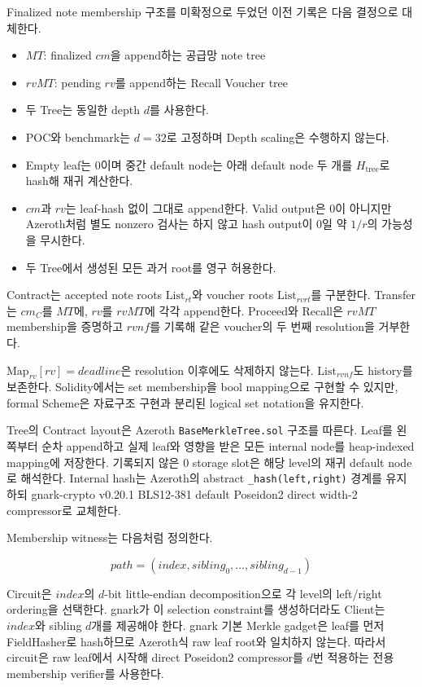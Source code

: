 \documentclass[11pt]{extarticle}
\newcommand{\List}[1]{\mathrm{List}_{#1}}
\newcommand{\Map}[1]{\mathrm{Map}_{#1}}
\begin{document}
Finalized note membership 구조를 미확정으로 두었던 이전 기록은 다음 결정으로 대체한다.

\begin{itemize}
  \item $MT$: finalized $cm$을 append하는 공급망 note tree
  \item $rvMT$: pending $rv$를 append하는 Recall Voucher tree
  \item 두 Tree는 동일한 depth $d$를 사용한다.
  \item POC와 benchmark는 $d=32$로 고정하며 Depth scaling은 수행하지 않는다.
  \item Empty leaf는 0이며 중간 default node는 아래 default node 두 개를
        $H_{\mathrm{tree}}$로 hash해 재귀 계산한다.
  \item $cm$과 $rv$는 leaf-hash 없이 그대로 append한다. Valid output은 0이 아니지만
        Azeroth처럼 별도 nonzero 검사는 하지 않고 hash output이 0일 약 $1/r$의
        가능성을 무시한다.
  \item 두 Tree에서 생성된 모든 과거 root를 영구 허용한다.
\end{itemize}

Contract는 accepted note roots $\List{rt}$와 voucher roots $\List{rvrt}$를 구분한다.
Transfer는 $cm_C$를 $MT$에, $rv$를 $rvMT$에 각각 append한다. Proceed와 Recall은
$rvMT$ membership을 증명하고 $rvnf$를 기록해 같은 voucher의 두 번째 resolution을
거부한다.

$\Map{rv}[rv]=deadline$은 resolution 이후에도 삭제하지 않는다. $\List{rvnf}$도
history를 보존한다. Solidity에서는 set membership을 bool mapping으로 구현할 수 있지만,
formal Scheme은 자료구조 구현과 분리된 logical set notation을 유지한다.

Tree의 Contract layout은 Azeroth \texttt{BaseMerkleTree.sol} 구조를 따른다. Leaf를
왼쪽부터 순차 append하고 실제 leaf와 영향을 받은 모든 internal node를 heap-indexed
mapping에 저장한다. 기록되지 않은 0 storage slot은 해당 level의 재귀 default node로
해석한다. Internal hash는 Azeroth의 abstract \texttt{\_hash(left,right)} 경계를
유지하되 gnark-crypto v0.20.1 BLS12-381 default Poseidon2 direct width-2 compressor로
교체한다.

Membership witness는 다음처럼 정의한다.

\[
path=(index,sibling_0,\ldots,sibling_{d-1})
\]

Circuit은 $index$의 $d$-bit little-endian decomposition으로 각 level의 left/right
ordering을 선택한다. gnark가 이 selection constraint를 생성하더라도 Client는
$index$와 sibling $d$개를 제공해야 한다. gnark 기본 Merkle gadget은 leaf를 먼저
FieldHasher로 hash하므로 Azeroth식 raw leaf root와 일치하지 않는다. 따라서 circuit은
raw leaf에서 시작해 direct Poseidon2 compressor를 $d$번 적용하는 전용 membership
verifier를 사용한다.
\end{document}
